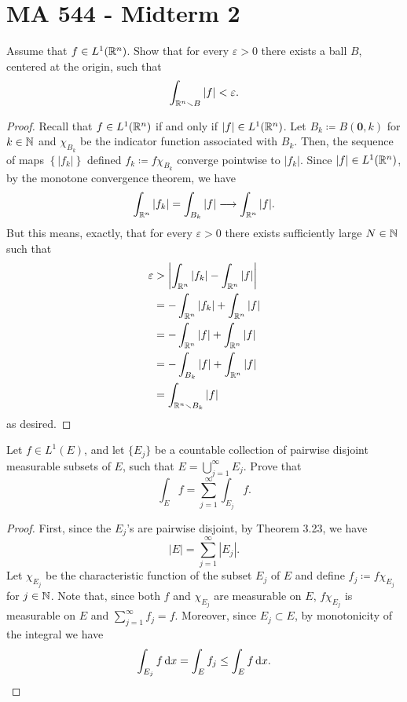 \section{MA 544 - Midterm 2}
\begin{problem}
Assume that $f\in L^1(\mathbb{R}^n)$. Show that for every $\varepsilon>0$ there
exists a ball $B$, centered at the origin, such that
\[
\int_{\mathbb{R}^n\smallsetminus B}|f|<\varepsilon.
\]
\end{problem}
\begin{proof}
Recall that $f\in L^1(\mathbb{R}^n)$ if and only if $|f|\in
L^1(\mathbb{R}^n)$. Let $B_k\coloneqq B(\mathbf{0},k)$ for $k\in\mathbb{N}$ and
$\chi_{B_k}$ be the indicator function associated with $B_k$. Then, the
sequence of maps $\left\{|f_k|\right\}$ defined $f_k\coloneqq f\chi_{B_k}$
converge pointwise to $|f_k|$. Since $|f|\in L^1(\mathbb{R}^n)$, by the monotone
convergence theorem, we have
\begin{equation}
\label{eq:monotonicity-2-1}
\int_{\mathbb{R}^n} |f_k|=\int_{B_k}|f|\longrightarrow\int_{\mathbb{R}^n}|f|.
\end{equation}
But this means, exactly, that for every $\varepsilon>0$ there exists
sufficiently large $N\in\mathbb{N}$ such that
\begin{equation}
  \label{eq:desired-inequality-2-1}
\begin{aligned}
\varepsilon&>\left|\int_{\mathbb{R}^n}|f_k|-\int_{\mathbb{R}^n}|f|\right|\\
&=-\int_{\mathbb{R}^n}|f_k|+\int_{\mathbb{R}^n}|f|\\
&=-\int_{\mathbb{R}^n}|f|+\int_{\mathbb{R}^n}|f|\\
&=-\int_{B_k}|f|+\int_{\mathbb{R}^n}|f|\\
&=\int_{\mathbb{R}^n\smallsetminus B_k}|f|
\end{aligned}
\end{equation}
as desired.
\end{proof}

\begin{problem}
Let $f\in L^1(E)$, and let $\{E_j\}$ be a countable collection of pairwise
disjoint measurable subsets of $E$, such that $E=\bigcup_{j=1}^\infty
E_j$. Prove that
\[
\int_E f=\sum_{j=1}^\infty\int_{E_j}f.
\]
\end{problem}
\begin{proof}
First, since the $E_j$'s are pairwise disjoint, by Theorem 3.23, we have
\begin{equation}
\label{eq:disjoint-measure-2-2}
|E|=\sum_{j=1}^\infty|E_j|.
\end{equation}
Let $\chi_{E_j}$ be the characteristic function of the subset $E_j$ of
$E$ and define $f_j\coloneqq f\chi_{E_j}$ for $j\in\mathbb{N}$. Note that, since
both $f$ and $\chi_{E_j}$ are measurable on $E$, $f\chi_{E_j}$ is
measurable on $E$ and $\sum_{j=1}^\infty f_j=f$. Moreover, since
$E_j\subset E$, by monotonicity of the integral we have
\begin{equation}
\label{eq:monotonicity-2-2}
\int_{E_j} f\mathop{}\!\mathrm{d} x=\int_E f_j\leq\int_{E} f\mathop{}\!\mathrm{d} x.
\end{equation}
\end{proof}

